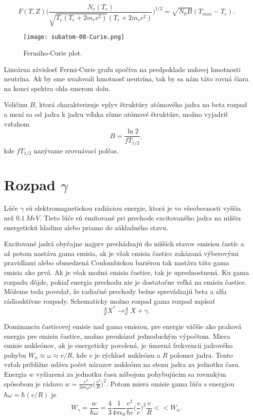 \documentclass[../../main.tex]{subfiles}
\begin{document}
$$ F(T,Z) \bigg( \frac{N_e(T_e)}{\sqrt{T_e(T_e+2m_ec^2)}(T_e+2m_ec^2)}  \bigg)^{1/2} = \sqrt{N_0B}(T_{max}-T_e).$$ 

\begin{figure}[!h]
\texttt{[image: subatom-08-Curie.png]}
\centering
\caption{Fermiho-Curie plot.}
\label{sf8:fig:Curie}
\end{figure}

Lineárna závislosť Fermi-Curie grafu spočíva na predpoklade nulovej hmotnosti neutrína. Ak by sme uvažovali hmotnosť neutrína, tak by sa nám táto rovná čiara na konci spektra ohla smerom dolu.

Veličinu $B$, ktorá charakterizuje vplyv štruktúry atómového jadra na beta rozpad a mení sa od jadra k jadru vďaka rôzne atómové štruktúre, možno vyjadriť vzťahom
$$ B= \frac{\ln2}{fT_{1/2}},$$
kde $fT_{1/2}$ nazývame zrovnávací polčas.

\section{Rozpad $\gamma$}
Lúče $\gamma$ sú elektromagnetickou radiáciou energie, ktorá je vo všeobecnosti vyššia než $0.1\,\unit{MeV}$. Tieto lúče sú emitované pri prechode excitovaného jadra na nižšiu energetickú hladinu alebo priamo do základného stavu.

Excitované jadrá obyčajne najprv prechádzajú do nižších stavov emisiou častíc a až potom nastáva gama emisia, ak je však emisia častice zakázaná výberovými pravidlami alebo obmedzená Coulombickou bariérou tak nastáva táto gama emisia ako prvá. Ak je však možná emisia častice, tak je uprednostnená. Ku gama rozpadu dôjde, pokiaľ energia prechodu nie je dostatočne veľká na emisiu častice. Môžeme teda povedať, že radiačné prechody bežne sprevádzajú beta a alfa rádioaktívne rozpady. Schematicky možno rozpad gama rozpad zapísať
$$ ^A_ZX^{*} \rightarrow ^A_ZX + \gamma.$$

Dominanciu časticovej emisie nad gama emisiou, pre energie väčšie ako prahová energia pre emisiu častice, možno preukázať jednoduchým výpočtom. Miera emisie nukleónov, ak je energeticky povolená, je úmerná frekvencii jadrového pohybu $W_n \approx \omega \approx v/R$, kde $v$ je rýchlosť nukleónu a $R$ polomer jadra. Tento vzťah približne udáva počet nárazov nukleónu na stenu jadra za jednotku času. Energia $w$ vyžiarená za jednotku času nábojom pohybujúcim sa rovnakým spôsobom je rádovo $w = \frac{e^2}{3\pi\epsilon_0c^3}\big(\frac{v^2}{R}\big)^2.$ Potom miera emisie gama lúča s energiou $\hbar \omega = \hbar(v/R)$ je 
$$ W_{\gamma} = \frac{w}{\hbar \omega} = \frac{4}{3}\frac{1}{4\pi \epsilon_0} \frac{e^2}{\hbar c} \bigg( \frac{v}{c} \bigg)^2 \frac{v}{R} << W_n. $$
\end{document}
